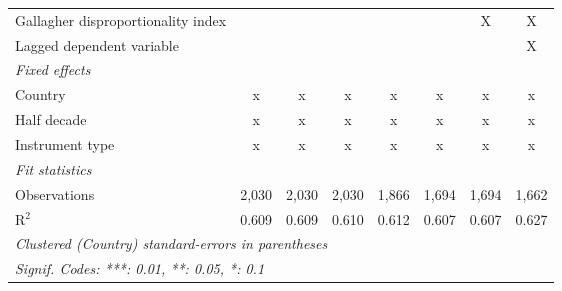 \begin{tabular}{lccccccc}
   Gallagher disproportionality index                                   &         &         &         &         &               & X             & X\\  
   Lagged dependent variable                                            &         &         &         &         &               &               & X\\  
   \emph{Fixed effects}\\
   Country                                                              & x       & x       & x       & x       & x             & x             & x\\  
   Half decade                                                          & x       & x       & x       & x       & x             & x             & x\\  
   Instrument type                                                      & x       & x       & x       & x       & x             & x             & x\\  
   \midrule \emph{Fit statistics}\\
   Observations                                                         & 2,030   & 2,030   & 2,030   & 1,866   & 1,694         & 1,694         & 1,662\\  
   R$^2$                                                                & 0.609   & 0.609   & 0.610   & 0.612   & 0.607         & 0.607         & 0.627\\  
   \midrule
   \multicolumn{8}{l}{\emph{Clustered (Country) standard-errors in parentheses}}\\
   \multicolumn{8}{l}{\emph{Signif. Codes: ***: 0.01, **: 0.05, *: 0.1}}\\
\end{tabular}
\par\endgroup


